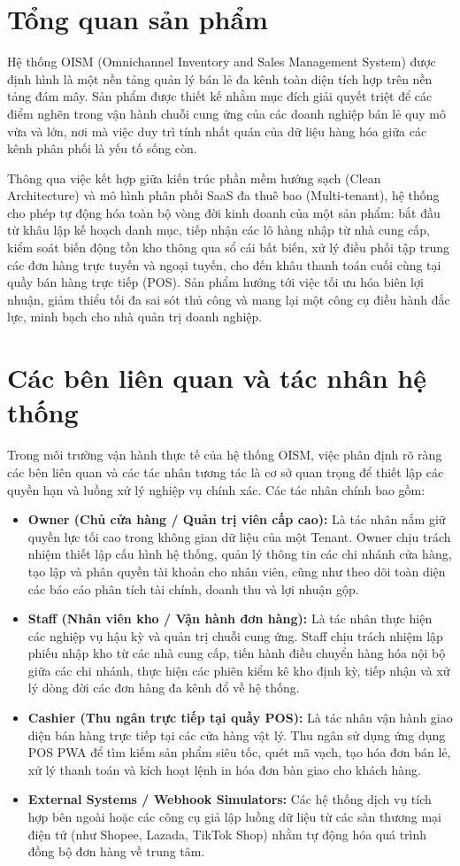 \documentclass[12pt,a4paper]{report}
\begin{document}
	\section{Tổng quan sản phẩm}
	Hệ thống OISM (Omnichannel Inventory and Sales Management System) được định hình là một nền tảng quản lý bán lẻ đa kênh toàn diện tích hợp trên nền tảng đám mây. Sản phẩm được thiết kế nhằm mục đích giải quyết triệt để các điểm nghẽn trong vận hành chuỗi cung ứng của các doanh nghiệp bán lẻ quy mô vừa và lớn, nơi mà việc duy trì tính nhất quán của dữ liệu hàng hóa giữa các kênh phân phối là yếu tố sống còn.
	\par
	Thông qua việc kết hợp giữa kiến trúc phần mềm hướng sạch (Clean Architecture) và mô hình phân phối SaaS đa thuê bao (Multi-tenant), hệ thống cho phép tự động hóa toàn bộ vòng đời kinh doanh của một sản phẩm: bắt đầu từ khâu lập kế hoạch danh mục, tiếp nhận các lô hàng nhập từ nhà cung cấp, kiểm soát biến động tồn kho thông qua sổ cái bất biến, xử lý điều phối tập trung các đơn hàng trực tuyến và ngoại tuyến, cho đến khâu thanh toán cuối cùng tại quầy bán hàng trực tiếp (POS). Sản phẩm hướng tới việc tối ưu hóa biên lợi nhuận, giảm thiểu tối đa sai sót thủ công và mang lại một công cụ điều hành đắc lực, minh bạch cho nhà quản trị doanh nghiệp.
	
	\section{Các bên liên quan và tác nhân hệ thống}
	Trong môi trường vận hành thực tế của hệ thống OISM, việc phân định rõ ràng các bên liên quan và các tác nhân tương tác là cơ sở quan trọng để thiết lập các quyền hạn và luồng xử lý nghiệp vụ chính xác. Các tác nhân chính bao gồm:
	\begin{itemize}
		\item \textbf{Owner (Chủ cửa hàng / Quản trị viên cấp cao):} Là tác nhân nắm giữ quyền lực tối cao trong không gian dữ liệu của một Tenant. Owner chịu trách nhiệm thiết lập cấu hình hệ thống, quản lý thông tin các chi nhánh cửa hàng, tạo lập và phân quyền tài khoản cho nhân viên, cũng như theo dõi toàn diện các báo cáo phân tích tài chính, doanh thu và lợi nhuận gộp.
		\item \textbf{Staff (Nhân viên kho / Vận hành đơn hàng):} Là tác nhân thực hiện các nghiệp vụ hậu kỳ và quản trị chuỗi cung ứng. Staff chịu trách nhiệm lập phiếu nhập kho từ các nhà cung cấp, tiến hành điều chuyển hàng hóa nội bộ giữa các chi nhánh, thực hiện các phiên kiểm kê kho định kỳ, tiếp nhận và xử lý dòng đời các đơn hàng đa kênh đổ về hệ thống.
		\item \textbf{Cashier (Thu ngân trực tiếp tại quầy POS):} Là tác nhân vận hành giao diện bán hàng trực tiếp tại các cửa hàng vật lý. Thu ngân sử dụng ứng dụng POS PWA để tìm kiếm sản phẩm siêu tốc, quét mã vạch, tạo hóa đơn bán lẻ, xử lý thanh toán và kích hoạt lệnh in hóa đơn bàn giao cho khách hàng.
		\item \textbf{External Systems / Webhook Simulators:} Các hệ thống dịch vụ tích hợp bên ngoài hoặc các công cụ giả lập luồng dữ liệu từ các sàn thương mại điện tử (như Shopee, Lazada, TikTok Shop) nhằm tự động hóa quá trình đồng bộ đơn hàng về trung tâm.
	\end{itemize}
	
\end{document}
